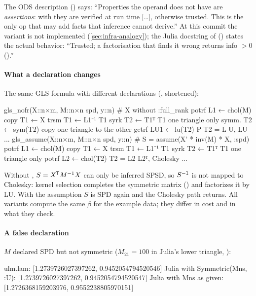 The ODS description () says:
``Properties the operand does not have are \emph{assertions}: with
 they are verified at run time [\ldots], otherwise trusted.
This is the only op that may add facts that inference cannot derive.'' At
this commit the  variant is not implemented
(\cref{sec:infra-analogy}); the Julia docstring of 
() states the actual
behavior: ``Trusted; a factorisation that finds it wrong returns
info \(>0\) ().''

\paragraph{What a declaration changes} The same GLS formula with different
declarations (, shortened):

\begin{textout}
gls_nofr(X::n×m, M::n×n spd, y::n)                 # X without :full_rank
  potrf    L1 ← chol(M)
  copy     T1 ← X
  trsm     T1 ← L1⁻¹ T1
  syrk     T2 ← T1ᵀ T1                       one triangle only
  symm.    T2 ← sym(T2)                      copy one triangle to the other
  getrf    LU1 ← lu(T2)                      P T2 = L U, LU
  ...
gls_assume(X::n×m, M::n×n spd, y::n)               # S = assume(X' * inv(M) * X, :spd)
  potrf    L1 ← chol(M)
  copy     T1 ← X
  trsm     T1 ← L1⁻¹ T1
  syrk     T2 ← T1ᵀ T1                       one triangle only
  potrf    L2 ← chol(T2)                     T2 = L2 L2ᵀ, Cholesky
  ...
\end{textout}

Without , \(S = X^{\mkern-1.5mu\mathsf{T}} M^{-1} X\) can only be inferred SPSD, so
\(S^{-1}\) is not mapped to Cholesky: kernel selection completes the
symmetric matrix () and factorizes it by LU. With the
assumption \(S\) is SPD again and the Cholesky path returns. All variants
compute the same \(\beta\) for the example data; they differ in cost and in
what they check.

\paragraph{A false declaration} \(M\) declared SPD but not symmetric
(\(M_{21}=100\) in Julia's lower triangle, ):

\begin{textout}
ulm.lam: [1.2739726027397262, 0.9452054794520546]
Julia with Symmetric(Mns, :U): [1.2739726027397262, 0.9452054794520547]
Julia with Mns as given:       [1.2726368159203976, 0.9552238805970151]
\end{textout}

